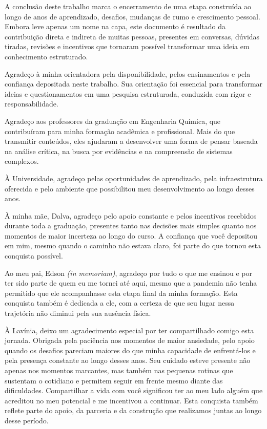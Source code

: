 \begin{agradecimentos}

A conclusão deste trabalho marca o encerramento de uma etapa construída ao longo de anos de aprendizado, desafios, mudanças de rumo e crescimento pessoal. Embora leve apenas um nome na capa, este documento é resultado da contribuição direta e indireta de muitas pessoas, presentes em conversas, dúvidas tiradas, revisões e incentivos que tornaram possível transformar uma ideia em conhecimento estruturado.

Agradeço à minha orientadora pela disponibilidade, pelos ensinamentos e pela confiança depositada neste trabalho. Sua orientação foi essencial para transformar ideias e questionamentos em uma pesquisa estruturada, conduzida com rigor e responsabilidade.

Agradeço aos professores da graduação em Engenharia Química, que contribuíram para minha formação acadêmica e profissional. Mais do que transmitir conteúdos, eles ajudaram a desenvolver uma forma de pensar baseada na análise crítica, na busca por evidências e na compreensão de sistemas complexos.

À Universidade, agradeço pelas oportunidades de aprendizado, pela infraestrutura oferecida e pelo ambiente que possibilitou meu desenvolvimento ao longo desses anos.

À minha mãe, Dalva, agradeço pelo apoio constante e pelos incentivos recebidos durante toda a graduação, presentes tanto nas decisões mais simples quanto nos momentos de maior incerteza ao longo do curso. A confiança que você depositou em mim, mesmo quando o caminho não estava claro, foi parte do que tornou esta conquista possível.

Ao meu pai, Edson \textit{(in memoriam)}, agradeço por tudo o que me ensinou e por ter sido parte de quem eu me tornei até aqui, mesmo que a pandemia não tenha permitido que ele acompanhasse esta etapa final da minha formação. Esta conquista também é dedicada a ele, com a certeza de que seu lugar nessa trajetória não diminui pela sua ausência física.

À Lavínia, deixo um agradecimento especial por ter compartilhado comigo esta jornada. Obrigada pela paciência nos momentos de maior ansiedade, pelo apoio quando os desafios pareciam maiores do que minha capacidade de enfrentá-los e pela presença constante ao longo desses anos. Seu cuidado esteve presente não apenas nos momentos marcantes, mas também nas pequenas rotinas que sustentam o cotidiano e permitem seguir em frente mesmo diante das dificuldades. Compartilhar a vida com você significou ter ao meu lado alguém que acreditou no meu potencial e me incentivou a continuar. Esta conquista também reflete parte do apoio, da parceria e da construção que realizamos juntas ao longo desse período.


\end{agradecimentos}
